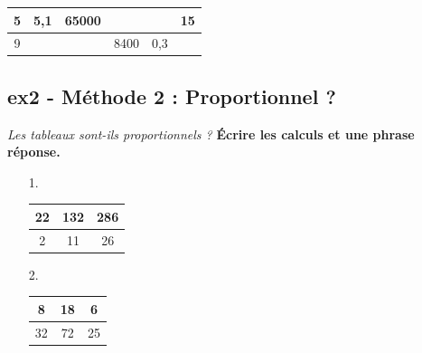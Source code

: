 \documentclass[11pt]{article}
\begin{document}
\begin{center}
  \begin{tabular}{|c|c|c|c|c|c|}
    \hline
   5 &  5,1                   &                  65000 &  \phantom{100 000 000} &  \phantom{100 000 000} &                     15\\ \hline
   9 &  \phantom{100 000 000} &  \phantom{100 000 000} &                   8400 &                    0,3 &  \phantom{100 000 000}\\ \hline     
  \end{tabular}
\end{center}
\Pointilles[5]

\subsection*{ex2 - Méthode 2 : Proportionnel ?}
\textit{Les tableaux sont-ils proportionnels ? } \newline
\textbf{Écrire les calculs et une phrase réponse.}

\begin{minipage}[t]{0.2\textwidth}
  \begin{enumerate}
    \item[1.]
    \begin{tabular}{|c|c|c|}
      \hline
      22 & 132 & 286 \\  \hline
      2 & 11 & 26\\  \hline
    \end{tabular}
  \item[2.]
    \begin{tabular}{|c|c|c|}
      \hline
      8 & 18 & 6 \\  \hline
      32 & 72 & 25\\  \hline
    \end{tabular}
  \end{enumerate}
\end{minipage}
\begin{minipage}[t]{0.8\textwidth}
  \Pointilles[6]
\end{minipage}
\end{document}
